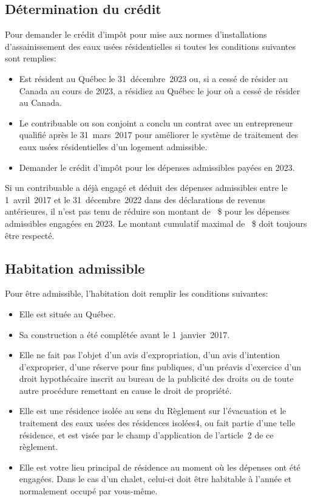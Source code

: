 \subsection{Détermination du crédit}
Pour demander le crédit d'impôt pour mise aux normes d'installations d'assainissement des eaux usées résidentielles si toutes les conditions suivantes sont remplies:
\begin{itemize}[label=]
	\item Est résident au Québec le 31~décembre~2023 ou, si a cessé de résider au Canada au cours de 2023, a résidiez au Québec le jour où a cessé de résider au Canada.
	\item Le contribuable ou son conjoint a conclu un contrat avec un entrepreneur qualifié après le 31~mars~2017 pour améliorer le système de traitement des eaux usées résidentielles d'un logement admissible.
	\item Demander le crédit d'impôt pour les dépenses admissibles payées en 2023.
\end{itemize}

Si un contribuable a déjà engagé et déduit des dépenses admissibles entre
le 1\ier{}~avril~2017 et le 31~décembre~2022 dans des déclarations de revenus antérieures, il n'est pas tenu de réduire son montant de ~\$ pour les dépenses admissibles engagées en 2023. Le montant cumulatif maximal de ~\$ doit toujours être respecté.


\subsection{Habitation admissible}
Pour être admissible, l'habitation doit remplir les conditions suivantes:
\begin{itemize}[label=]
	\item Elle est située au Québec. 
	\item Sa construction a été complétée avant le 1\ier{}~janvier~2017. 
	\item Elle ne fait pas l'objet d'un avis d'expropriation, d'un avis d'intention d'exproprier, d'une réserve pour fins publiques, d'un préavis d'exercice d'un droit hypothécaire inscrit au bureau de la publicité des droits ou de toute autre procédure remettant en cause le droit de propriété. 
	\item Elle est une résidence isolée au sens du Règlement sur l'évacuation et le traitement des eaux usées des résidences isolées4, ou fait partie d'une telle résidence, et est visée par le champ d'application de l'article~2 de ce règlement. 
	\item Elle est votre lieu principal de résidence au moment où les dépenses ont été engagées. Dans le cas d'un chalet, celui-ci doit être habitable à l'année et normalement occupé par vous-même.
\end{itemize}


